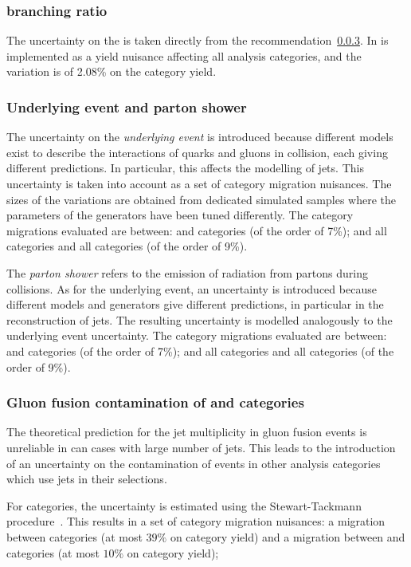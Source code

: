 \subsubsection{\Hgg branching ratio}
The uncertainty on the \Hgg \BR is taken directly from the \LHCHXSWG recommendation~\ref{}. In is implemented as a yield nuisance affecting all analysis categories, and the variation is of 2.08\% on the category yield.

\subsubsection{Underlying event and parton shower}
The uncertainty on the \emph{underlying event} is introduced because different models exist to describe the interactions of quarks and gluons in \pp collision, each giving different predictions. In particular, this affects the modelling of jets. This uncertainty is taken into account as a set of category migration nuisances. The sizes of the variations are obtained from dedicated simulated samples where the parameters of the generators have been tuned differently. The category migrations evaluated are between:  and  categories (of the order of 7\%); and all \VBFTag categories and all \Untagged categories (of the order of 9\%).

The \emph{parton shower} refers to the emission of \QCD radiation from partons during \pp collisions. As for the underlying event, an uncertainty is introduced because different models and generators give different predictions, in particular in the reconstruction of jets. The resulting uncertainty is modelled analogously to the underlying event uncertainty.  The category migrations evaluated are between:  and  categories (of the order of 7\%); and all \VBFTag categories and all \Untagged categories (of the order of 9\%).

\subsubsection{Gluon fusion contamination of \VBFTag and \TTHTag categories}

The theoretical prediction for the jet multiplicity in gluon fusion events is unreliable in can cases with large number of jets. This leads to the introduction of an uncertainty on the contamination of \ggH events in other analysis categories which use jets in their selections. 

For \VBFTag categories, the uncertainty is estimated using the Stewart-Tackmann procedure~\cite{StewartTackmann}. This results in a set of category migration nuisances: a migration between \VBFTag categories (at most $39\%$ on category yield) and a migration between \Untagged and \VBFTag categories (at most $10\%$ on category yield); %

